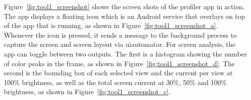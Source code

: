Figure~\ref{fig:tool1_screenshot} shows the screen shots of the
profiler app in action. The app displays a floating icon which is an Android service
that overlays on top of the app that is running, as shown
in Figure~\ref{fig:tool1_screenshot_a}. Whenever the icon is pressed, it sends
a message to the background process to capture the screen and screen
layout via uiautomator.
For screen analysis, the app can toggle between two outputs.
The first is a histogram showing the number of color peaks in the frame,
as shown in Figure~\ref{fig:tool1_screenshot_d}.
The second is the bounding box of
each selected view and the current per view at 100\%
brightness, as well as the total screen current at 30\%, 50\% and 100\%
brightness, as shown in Figure~\ref{fig:tool1_screenshot_c}.

% 
% 

